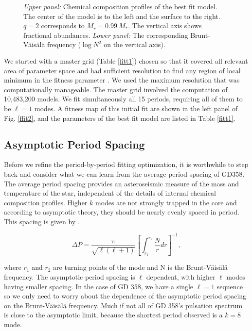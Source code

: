 \documentclass[12pt,preprint]{aastex}
\newcommand{\bvf}{Brunt-V\"ais\"al\"a }
\begin{document}
\begin{figure}
\caption{
{\em Upper panel:} Chemical composition profiles of the best fit model. The center of the model is 
to the left and the surface to the right.  $q=2$ corresponds to $M_r = 0.99 \: M_*$. The vertical axis
shows fractional abundances. 
{\em Lower panel:} The corresponding \bvf frequency ($\log{N^2}$ on the vertical axis). \label{ffit1}
}
\end{figure}

We started with a master grid (Table \ref{fitt1}) chosen so that it covered all relevant 
area of parameter space and had sufficient resolution to find any region of local minimum 
in the fitness parameter \citep{Bischoff-Kim11a,Bischoff-Kim14}. We used the maximum resolution 
that was computationally manageable. The master grid involved the computation 
of 10,483,200 models. We fit simultaneously all 15 periods, requiring all of them to be $\ell=1$ 
modes. A fitness map of this initial fit are shown in the left panel of Fig. \ref{ffit2}, and the 
parameters of the best fit model are listed in Table \ref{fitt1}.

\subsection{Asymptotic Period Spacing}
\label{periodspacing}

Before we refine the period-by-period fitting optimization, it is worthwhile to step back and consider 
what we can learn from the average period spacing of GD358. The average period spacing provides an 
asteroseismic measure of the mass and temperature of the star, independent of the details of 
internal chemical composition profiles. Higher $k$ modes are not strongly trapped in the core and 
according to asymptotic theory, they should be nearly evenly spaced in period. This spacing is 
given by \citet{Unno89}.

\begin{equation}
\label{fiteq2}
\Delta P = \frac{\pi}{\sqrt{\ell(\ell + 1)}}\left[\int_{r_1}^{r_2}\frac{N}{r}dr\right]^{-1},
\end{equation}

\noindent
where $r_1$ and $r_2$ are turning points of the mode and N is the Brunt-V\"{a}is\"{a}l\"{a} frequency. 
The asymptotic period spacing is $\ell$ dependent, with higher $\ell$ modes having smaller spacing. 
In the case of GD 358, we have a single $\ell=1$ sequence so we only need to worry about the dependence 
of the asymptotic period spacing on the \bvf frequency. Much if not all of GD 358's pulsation 
spectrum is close to the asymptotic limit, because the shortest period observed is a $k=8$ mode.
\end{document}

